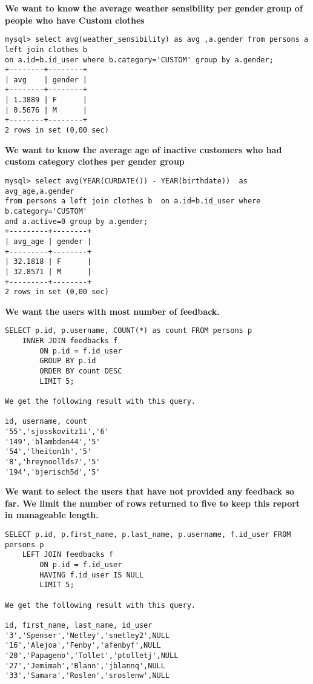 \documentclass[]{article}
\begin{document}
\textbf{We want to know the average weather sensibility per gender group of people who have Custom clothes}
\begin{verbatim}
mysql> select avg(weather_sensibility) as avg ,a.gender from persons a 
left join clothes b  
on a.id=b.id_user where b.category='CUSTOM' group by a.gender;
+--------+--------+
| avg    | gender |
+--------+--------+
| 1.3889 | F      |
| 0.5676 | M      |
+--------+--------+
2 rows in set (0,00 sec)
\end{verbatim}


\textbf{We want to know the average age of inactive customers who had custom category clothes per gender group}
\begin{verbatim}
mysql> select avg(YEAR(CURDATE()) - YEAR(birthdate))  as avg_age,a.gender 
from persons a left join clothes b  on a.id=b.id_user where b.category='CUSTOM' 
and a.active=0 group by a.gender;
+---------+--------+
| avg_age | gender |
+---------+--------+
| 32.1818 | F      |
| 32.8571 | M      |
+---------+--------+
2 rows in set (0,00 sec)
\end{verbatim}


\textbf{We want the users with most number of feedback.}
\begin{verbatim}
SELECT p.id, p.username, COUNT(*) as count FROM persons p
	INNER JOIN feedbacks f
		ON p.id = f.id_user
        GROUP BY p.id
        ORDER BY count DESC
        LIMIT 5;

We get the following result with this query.

id, username, count
'55','sjosskovitz1i','6'
'149','blambden44','5'
'54','lheiton1h','5'
'8','hreynoollds7','5'
'194','bjerisch5d','5'
\end{verbatim}

\textbf{We want to select the users that have not provided any feedback so far. We limit the number of rows returned to five to keep this report in manageable length.} 

\begin{verbatim}
SELECT p.id, p.first_name, p.last_name, p.username, f.id_user FROM persons p
	LEFT JOIN feedbacks f
		ON p.id = f.id_user
        HAVING f.id_user IS NULL
        LIMIT 5;

We get the following result with this query.

id, first_name, last_name, id_user 
'3','Spenser','Netley','snetley2',NULL
'16','Alejoa','Fenby','afenbyf',NULL
'20','Papageno','Tollet','ptolletj',NULL
'27','Jemimah','Blann','jblannq',NULL
'33','Samara','Roslen','sroslenw',NULL
\end{verbatim}
\end{document}
